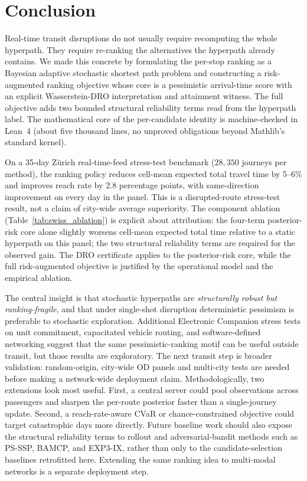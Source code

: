 \documentclass[opre,dblanonrev]{informs4}
\begin{document}
\section{Conclusion}
\label{sec:conclusion}

Real-time transit disruptions do not usually require recomputing
the whole hyperpath. They require re-ranking the alternatives the
hyperpath already contains. We made this concrete by formulating
the per-stop ranking as a Bayesian adaptive stochastic shortest
path problem and constructing a risk-augmented ranking objective
whose core is a pessimistic arrival-time score with an explicit
Wasserstein-DRO interpretation and attainment witness. The full
objective adds two bounded structural reliability terms read from
the hyperpath label.
The mathematical core of the per-candidate identity is
machine-checked in Lean~4 (about five thousand lines, no unproved
obligations beyond Mathlib's standard kernel).

On a 35-day Z\"urich real-time-feed stress-test benchmark
($28{,}350$ journeys per method), the ranking policy reduces
cell-mean expected total travel time by 5--6\% and improves reach
rate by 2.8 percentage points, with same-direction improvement on
every day in the panel. This is a disrupted-route stress-test result,
not a claim of city-wide average superiority. The component ablation
(Table~\ref{tab:swiss_ablation}) is explicit about attribution:
the four-term posterior-risk core alone slightly worsens cell-mean
expected total time relative to a static hyperpath on this panel; the
two structural reliability terms are required for the observed gain.
The DRO certificate applies to the posterior-risk core, while the
full risk-augmented objective is justified by the operational model
and the empirical ablation.

The central insight is that stochastic hyperpaths are
\emph{structurally robust but ranking-fragile}, and that under
single-shot disruption deterministic pessimism is preferable to
stochastic exploration. Additional Electronic Companion stress
tests on unit commitment, capacitated vehicle routing, and
software-defined networking suggest that the same
pessimistic-ranking motif can be useful outside transit, but
those results are exploratory.
The next transit step is broader validation: random-origin,
city-wide OD panels and multi-city tests are needed before making a
network-wide deployment claim. Methodologically, two extensions look
most useful. First, a central server could pool observations across
passengers and sharpen the per-route posterior faster than a
single-journey update. Second, a reach-rate-aware CVaR or
chance-constrained objective could target catastrophic days more
directly. Future baseline work should also expose the structural
reliability terms to rollout and adversarial-bandit methods such as
PS-SSP, BAMCP, and EXP3-IX, rather than only to the
candidate-selection baselines retrofitted here. Extending the same
ranking idea to multi-modal networks is a separate deployment step.
\end{document}
